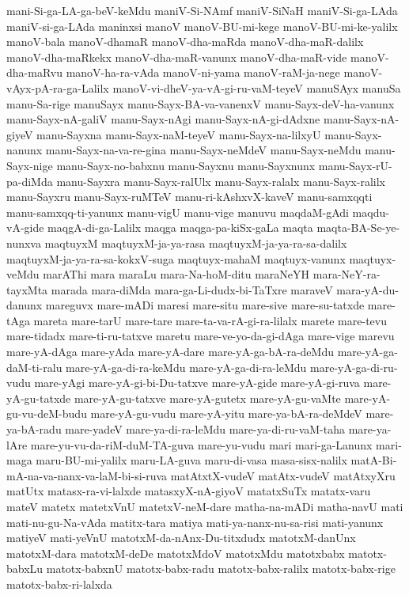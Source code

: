 {mani-Si-ga-LA-ga-beV-keMdu
maniV-Si-NAmf
maniV-SiNaH
maniV-Si-ga-LAda
maniV-si-ga-LAda
maninxsi
manoV
manoV-BU-mi-kege
manoV-BU-mi-ke-yalilx
manoV-bala
manoV-dhamaR
manoV-dha-maRda
manoV-dha-maR-dalilx
manoV-dha-maRkekx
manoV-dha-maR-vanunx
manoV-dha-maR-vide
manoV-dha-maRvu
manoV-ha-ra-vAda
manoV-ni-yama
manoV-raM-ja-nege
manoV-vAyx-pA-ra-ga-Lalilx
manoV-vi-dheV-ya-vA-gi-ru-vaM-teyeV
manuSAyx
manuSa
manu-Sa-rige
manuSayx
manu-Sayx-BA-va-vanenxV
manu-Sayx-deV-ha-vanunx
manu-Sayx-nA-galiV
manu-Sayx-nAgi
manu-Sayx-nA-gi-dAdxne
manu-Sayx-nA-giyeV
manu-Sayxna
manu-Sayx-naM-teyeV
manu-Sayx-na-lilxyU
manu-Sayx-nanunx
manu-Sayx-na-va-re-gina
manu-Sayx-neMdeV
manu-Sayx-neMdu
manu-Sayx-nige
manu-Sayx-no-babxnu
manu-Sayxnu
manu-Sayxnunx
manu-Sayx-rU-pa-diMda
manu-Sayxra
manu-Sayx-ralUlx
manu-Sayx-ralalx
manu-Sayx-ralilx
manu-Sayxru
manu-Sayx-ruMTeV
manu-ri-kAshxvX-kaveV
manu-samxqqti
manu-samxqq-ti-yanunx
manu-vigU
manu-vige
manuvu
maqdaM-gAdi
maqdu-vA-gide
maqgA-di-ga-Lalilx
maqga
maqga-pa-kiSx-gaLa
maqta
maqta-BA-Se-ye-nunxva
maqtuyxM
maqtuyxM-ja-ya-rasa
maqtuyxM-ja-ya-ra-sa-dalilx
maqtuyxM-ja-ya-ra-sa-kokxV-suga
maqtuyx-mahaM
maqtuyx-vanunx
maqtuyx-veMdu
marAThi
mara
maraLu
mara-Na-hoM-ditu
maraNeYH
mara-NeY-ra-tayxMta
marada
mara-diMda
mara-ga-Li-dudx-bi-TaTxre
maraveV
mara-yA-du-danunx
mareguvx
mare-mADi
maresi
mare-situ
mare-sive
mare-su-tatxde
mare-tAga
mareta
mare-tarU
mare-tare
mare-ta-va-rA-gi-ra-lilalx
marete
mare-tevu
mare-tidadx
mare-ti-ru-tatxve
maretu
mare-ve-yo-da-gi-dAga
mare-vige
marevu
mare-yA-dAga
mare-yAda
mare-yA-dare
mare-yA-ga-bA-ra-deMdu
mare-yA-ga-daM-ti-ralu
mare-yA-ga-di-ra-keMdu
mare-yA-ga-di-ra-leMdu
mare-yA-ga-di-ru-vudu
mare-yAgi
mare-yA-gi-bi-Du-tatxve
mare-yA-gide
mare-yA-gi-ruva
mare-yA-gu-tatxde
mare-yA-gu-tatxve
mare-yA-gutetx
mare-yA-gu-vaMte
mare-yA-gu-vu-deM-budu
mare-yA-gu-vudu
mare-yA-yitu
mare-ya-bA-ra-deMdeV
mare-ya-bA-radu
mare-yadeV
mare-ya-di-ra-leMdu
mare-ya-di-ru-vaM-taha
mare-ya-lAre
mare-yu-vu-da-riM-duM-TA-guva
mare-yu-vudu
mari
mari-ga-Lanunx
mari-maga
maru-BU-mi-yalilx
maru-LA-guva
maru-di-vasa
masa-sisx-nalilx
matA-Bi-mA-na-va-nanx-va-laM-bi-si-ruva
matAtxtX-vudeV
matAtx-vudeV
matAtxyXru
matUtx
matasx-ra-vi-lalxde
matasxyX-nA-giyoV
matatxSuTx
matatx-varu
mateV
matetx
matetxVnU
matetxV-neM-dare
matha-na-mADi
matha-navU
mati
mati-nu-gu-Na-vAda
matitx-tara
matiya
mati-ya-nanx-nu-sa-risi
mati-yanunx
matiyeV
mati-yeVnU
matotxM-da-nAnx-Du-titxdudx
matotxM-danUnx
matotxM-dara
matotxM-deDe
matotxMdoV
matotxMdu
matotxbabx
matotx-babxLu
matotx-babxnU
matotx-babx-radu
matotx-babx-ralilx
matotx-babx-rige
matotx-babx-ri-lalxda
}
